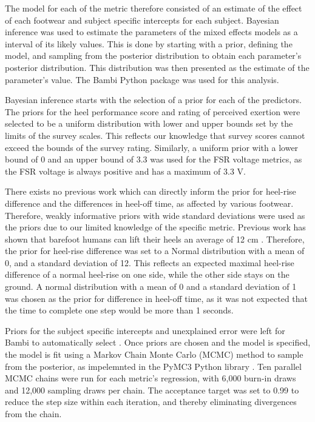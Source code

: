 \documentclass[defaultstyle,11pt]{thesis}
\begin{document}
The model for each of the metric therefore consisted of an estimate of the effect of each footwear and subject specific intercepts for each subject.
Bayesian inference was used to estimate the parameters of the mixed effects models as a interval of its likely values.
This is done by starting with a prior, defining the model, and sampling from the posterior distribution to obtain each parameter's posterior distribution.
This distribution was then presented as the estimate of the parameter's value.
The Bambi Python package \citep{Capretto2020} was used for this analysis.

Bayesian inference starts with the selection of a prior for each of the predictors.
The priors for the heel performance score and rating of perceived exertion were selected to be a uniform distribution with lower and upper bounds set by the limits of the survey scales.
This reflects our knowledge that survey scores cannot exceed the bounds of the survey rating.
Similarly, a uniform prior with a lower bound of 0 and an upper bound of 3.3 was used for the FSR voltage metrics, as the FSR voltage is always positive and has a maximum of 3.3 V.

There exists no previous work which can directly inform the prior for heel-rise difference and the differences in heel-off time, as affected by various footwear.
Therefore, weakly informative priors with wide standard deviations were used as the priors due to our limited knowledge of the specific metric.
Previous work has shown that barefoot humans can lift their heels an average of 12 cm \citep{Brorsson2017}.
Therefore, the prior for heel-rise difference was set to a Normal distribution with a mean of 0, and a standard deviation of 12.
This reflects an expected maximal heel-rise difference of a normal heel-rise on one side, while the other side stays on the ground.
A normal distribution with a mean of 0 and a standard deviation of 1 was chosen as the prior for difference in heel-off time, as it was not expected that the time to complete one step would be more than 1 seconds.

Priors for the subject specific intercepts and unexplained error were left for Bambi to automatically select \citep{Capretto2020}.
Once priors are chosen and the model is specified, the model is fit using a Markov Chain Monte Carlo (MCMC) method to sample from the posterior, as impelemnted in the PyMC3 Python library \citep{Salvatier2016}.
Ten parallel MCMC chains were run for each metric's regression, with 6,000 burn-in draws and 12,000 sampling draws per chain.
The acceptance target was set to 0.99 to reduce the step size within each iteration, and thereby eliminating divergences from the chain.
\end{document}
